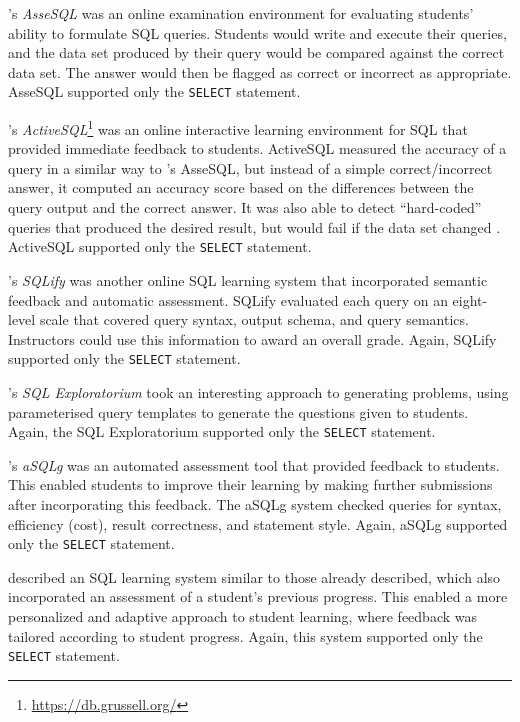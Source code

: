 \documentclass[sigconf, authordraft]{acmart}
\begin{document}
\citeauthor{Prior.J-2004a-Backwash}'s \emph{AsseSQL} \cite{Prior.J-2004a-Backwash} was an online examination environment for evaluating students' ability to formulate SQL queries. Students would write and execute their queries, and the data set produced by their query would be compared against the correct data set. The answer would then be flagged as correct or incorrect as appropriate. AsseSQL supported only the \texttt{SELECT} statement.

\citeauthor{Russell.G-2004a-Improving}'s \emph{ActiveSQL}\footnote{\url{https://db.grussell.org/}} \cite{Russell.G-2004a-Improving,Russell.G-2005a-Online} was an online interactive learning environment for SQL that provided immediate feedback to students. ActiveSQL measured the accuracy of a query in a similar way to \citeauthor{Prior.J-2004a-Backwash}'s AsseSQL, but instead of a simple correct/incorrect answer, it computed an accuracy score based on the differences between the query output and the correct answer. It was also able to detect ``hard-coded'' queries that produced the desired result, but would fail if the data set changed \cite{Russell.G-2005a-Online}. ActiveSQL supported only the \texttt{SELECT} statement.

\citeauthor{Dekeyser.S-2007a-Computer}'s \emph{SQLify} \cite{Dekeyser.S-2007a-Computer} was another online SQL learning system that incorporated semantic feedback and automatic assessment. SQLify evaluated each query on an eight-level scale that covered query syntax, output schema, and query semantics. Instructors could use this information to award an overall grade. Again, SQLify supported only the \texttt{SELECT} statement.

\citeauthor{Brusilovsky.P-2010a-Learning}'s \emph{SQL Exploratorium} \cite{Brusilovsky.P-2010a-Learning} took an interesting approach to generating problems, using parameterised query templates to generate the questions given to students. Again, the SQL Exploratorium supported only the \texttt{SELECT} statement.

\citeauthor{Kleiner.C-2013a-Automated}'s \emph{aSQLg} \cite{Kleiner.C-2013a-Automated} was an automated assessment tool that provided feedback to students. This enabled students to improve their learning by making further submissions after incorporating this feedback. The aSQLg system checked queries for syntax, efficiency (cost), result correctness, and statement style. Again, aSQLg supported only the \texttt{SELECT} statement.

\citeauthor{Kenny.C-2005a-Automated} \cite{Kenny.C-2005a-Automated} described an SQL learning system similar to those already described, which also incorporated an assessment of a student's previous progress. This enabled a more personalized and adaptive approach to student learning, where feedback was tailored according to student progress. Again, this system supported only the \texttt{SELECT} statement.
\end{document}
